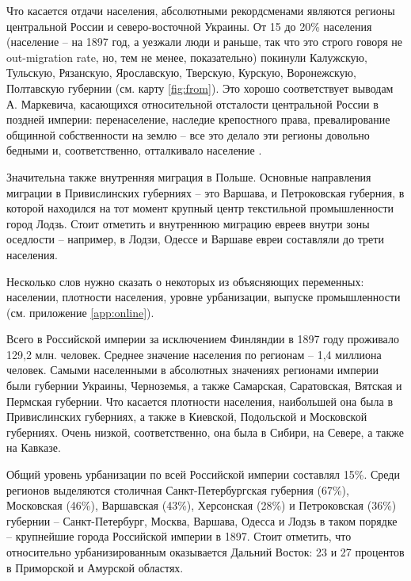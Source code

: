 \documentclass[a4paper,12pt]{article}
\begin{document}
Что касается отдачи населения, абсолютными рекордсменами являются регионы центральной России и северо-восточной Украины. От 15 до 20\% населения (население – на 1897 год, а уезжали люди и раньше, так что это строго говоря не out-migration rate, но, тем не менее, показательно) покинули Калужскую, Тульскую, Рязанскую, Ярославскую, Тверскую, Курскую, Воронежскую, Полтавскую губернии (см. карту \ref{fig:from}). Это хорошо соответствует выводам А. Маркевича, касающихся относительной отсталости центральной России в поздней империи: перенаселение, наследие крепостного права, превалирование общинной собственности на землю – все это делало эти регионы довольно бедными и, соответственно, отталкивало население \citep{markevich_regional_2019}.

Значительна также внутренняя миграция в Польше. Основные направления миграции в Привислинских губерниях – это Варшава, и Петроковская губерния, в которой находился на тот момент крупный центр текстильной промышленности город Лодзь. Стоит отметить и внутреннюю миграцию евреев внутри зоны оседлости – например, в Лодзи, Одессе и Варшаве евреи составляли до трети населения.

Несколько слов нужно сказать о некоторых из объясняющих переменных: населении, плотности населения, уровне урбанизации, выпуске промышленности (см. приложение \ref{app:online}).

Всего в Российской империи за исключением Финляндии в 1897 году проживало 129,2 млн. человек. Среднее значение населения по регионам – 1,4 миллиона человек. Самыми населенными в абсолютных значениях регионами империи были губернии Украины, Черноземья, а также Самарская, Саратовская, Вятская и Пермская губернии. Что касается плотности населения, наибольшей она была в Привислинских губерниях, а также в Киевской, Подольской и Московской губерниях. Очень низкой, соответственно, она была в Сибири, на Севере, а также на Кавказе. 

Общий уровень урбанизации по всей Российской империи составлял 15\%. Среди регионов выделяются столичная Санкт-Петербургская губерния (67\%), Московская (46\%), Варшавская (43\%), Херсонская (28\%) и Петроковская (36\%) губернии – Санкт-Петербург, Москва, Варшава, Одесса и Лодзь в таком порядке – крупнейшие города Российской империи в 1897. Стоит отметить, что относительно урбанизированным оказывается Дальний Восток: 23 и 27 процентов в Приморской и Амурской областях. 

\end{document}
